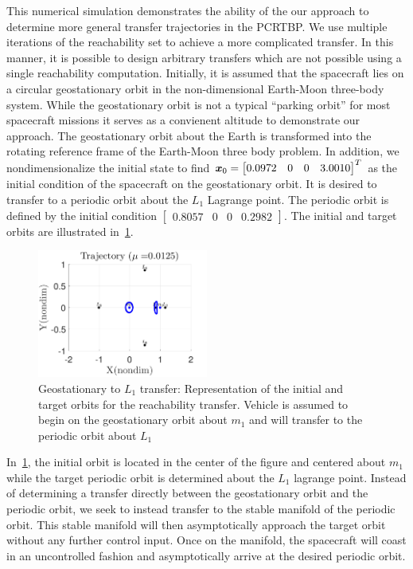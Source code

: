 \documentclass[smallcondensed]{svjour3}
\begin{document}
This numerical simulation demonstrates the ability of the our approach to determine more general transfer trajectories in the PCRTBP. 
We use multiple iterations of the reachability set to achieve a more complicated transfer.
In this manner, it is possible to design arbitrary transfers which are not possible using a single reachability computation.
Initially, it is assumed that the spacecraft lies on a circular geostationary orbit in the non-dimensional Earth-Moon three-body system. 
While the geostationary orbit is not a typical ``parking orbit'' for most spacecraft missions it serves as a convienent altitude to demonstrate our approach.
The geostationary orbit about the Earth is transformed into the rotating reference frame of the Earth-Moon three body problem.
In addition, we nondimensionalize the initial state to find \( \bm{x}_0 = \begin{bmatrix} 0.0972 & 0 & 0 & 3.0010\end{bmatrix}^T\) as the initial condition of the spacecraft on the geostationary orbit.
It is desired to transfer to a periodic orbit about the \( L_1 \) Lagrange point. 
The periodic orbit is defined by the initial condition \(\begin{bmatrix} 0.8057 & 0 & 0 & 0.2982 \end{bmatrix} \).
The initial and target orbits are illustrated in~\cref{fig:geo_transfer_target}.
\begin{figure}[htbp]
   \centering
   \includegraphics[width=0.5\textwidth]{initial_final} %
   \caption{Geostationary to \( L_1 \) transfer: Representation of the initial and target orbits for the reachability transfer. 
   Vehicle is assumed to begin on the geostationary orbit about \( m_1\) and will transfer to the periodic orbit about \( L_1\)}
   \label{fig:geo_transfer_target}
\end{figure}
In~\cref{fig:geo_transfer_target}, the initial orbit is located in the center of the figure and centered about \( m_1 \) while the target periodic orbit is determined about the \( L_1 \) lagrange point.
Instead of determining a transfer directly between the geostationary orbit and the periodic orbit, we seek to instead transfer to the stable manifold of the periodic orbit.
This stable manifold will then asymptotically approach the target orbit without any further control input.
Once on the manifold, the spacecraft will coast in an uncontrolled fashion and asymptotically arrive at the desired periodic orbit.
\end{document}
